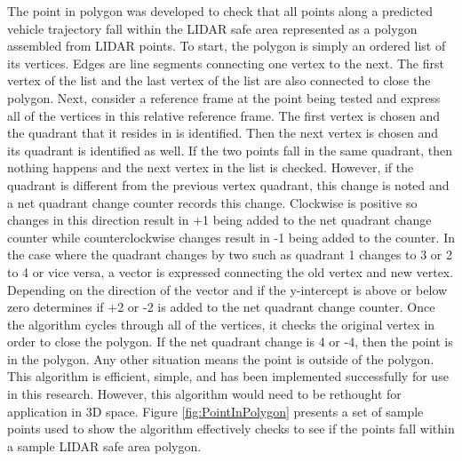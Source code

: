 \documentclass[12pt,onecolumn]{report}
\begin{document}
The point in polygon was developed to check that all points along a predicted vehicle trajectory fall within the LIDAR safe area represented as a polygon assembled from LIDAR points. To start, the polygon is simply an ordered list of its vertices. Edges are line segments connecting one vertex to the next. The first vertex of the list and the last vertex of the list are also connected to close the polygon.   Next, consider a reference frame at the point being tested and express all of the vertices in this relative reference frame. The first vertex is chosen and the quadrant that it resides in is identified. Then the next vertex is chosen and its quadrant is identified as well. If the two points fall in the same quadrant, then nothing happens and the next vertex in the list is checked. However, if the quadrant is different from the previous vertex quadrant, this change is noted and a net quadrant change counter records this change. Clockwise is positive so changes in this direction result in +1 being added to the net quadrant change counter while counterclockwise changes result in -1 being added to the counter. In the case where the quadrant changes by two such as quadrant 1 changes to 3 or 2 to 4 or vice versa, a vector is expressed connecting the old vertex and new vertex. Depending on the direction of the vector and if the y-intercept is above or below zero determines if +2 or -2 is added to the net quadrant change counter. Once the algorithm cycles through all of the vertices, it checks the original vertex in order to close the polygon. If the net quadrant change is 4 or -4, then the point is in the polygon. Any other situation means the point is outside of the polygon. This algorithm is efficient, simple, and has been implemented successfully for use in this research. However, this algorithm would need to be rethought for application in 3D space. Figure \ref{fig:PointInPolygon} presents a set of sample points used to show the algorithm effectively checks to see if the points fall within a sample LIDAR safe area polygon.
\end{document}
